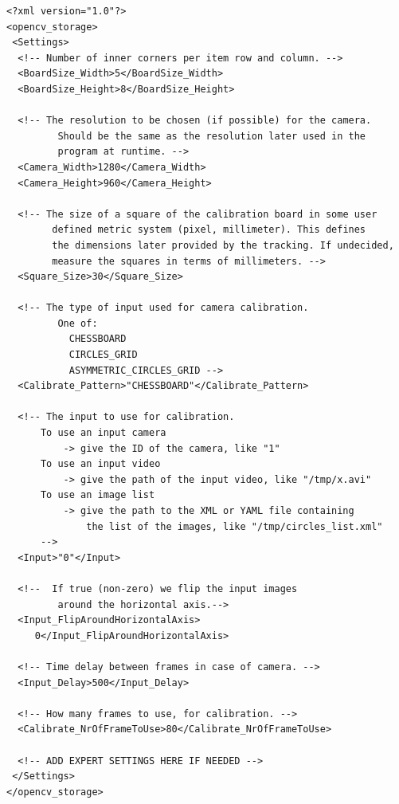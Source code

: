 \begin{lstlisting}[float,caption={Configuration file example for camera calibration - Most important settings},label=cameracalibrationconfigexampleimportantsettings]
<?xml version="1.0"?>
<opencv_storage>
 <Settings>
  <!-- Number of inner corners per item row and column. -->
  <BoardSize_Width>5</BoardSize_Width>
  <BoardSize_Height>8</BoardSize_Height>
  
  <!-- The resolution to be chosen (if possible) for the camera. 
         Should be the same as the resolution later used in the
         program at runtime. -->
  <Camera_Width>1280</Camera_Width>
  <Camera_Height>960</Camera_Height>  
  
  <!-- The size of a square of the calibration board in some user 
        defined metric system (pixel, millimeter). This defines
        the dimensions later provided by the tracking. If undecided,
        measure the squares in terms of millimeters. -->
  <Square_Size>30</Square_Size>
  
  <!-- The type of input used for camera calibration. 
         One of: 
           CHESSBOARD 
           CIRCLES_GRID 
           ASYMMETRIC_CIRCLES_GRID -->
  <Calibrate_Pattern>"CHESSBOARD"</Calibrate_Pattern>
  
  <!-- The input to use for calibration. 
      To use an input camera 
          -> give the ID of the camera, like "1"
      To use an input video  
          -> give the path of the input video, like "/tmp/x.avi"
      To use an image list   
          -> give the path to the XML or YAML file containing 
              the list of the images, like "/tmp/circles_list.xml"
      -->
  <Input>"0"</Input>
  
  <!--  If true (non-zero) we flip the input images 
         around the horizontal axis.-->
  <Input_FlipAroundHorizontalAxis>
     0</Input_FlipAroundHorizontalAxis>
  
  <!-- Time delay between frames in case of camera. -->
  <Input_Delay>500</Input_Delay>	
  
  <!-- How many frames to use, for calibration. -->
  <Calibrate_NrOfFrameToUse>80</Calibrate_NrOfFrameToUse>

  <!-- ADD EXPERT SETTINGS HERE IF NEEDED -->  
 </Settings>
</opencv_storage>
\end{lstlisting}

